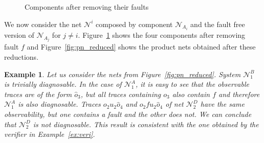 \documentclass[a4paper]{article}
\newcommand\netn{{\mathcal{N}}}
\newtheorem{exmp}{Example}
\begin{document}
\begin{figure}[h]
{{ }}
   \caption{Components after removing their faults}
   \label{fig:reduced}
 \end{figure}

We now consider the net $\netn^i$ composed by component $\netn_{A_i}$ and the fault free version of $\netn_{A_j}$ for $j \not = i$. Figure~\ref{fig:reduced} shows the four components after removing fault $f$ and Figure~\ref{fig:pn_reduced} shows the product nets obtained after these reductions.

\begin{exmp}
  Let us consider the nets from Figure~\ref{fig:pn_reduced}. System $\netn_1^B$ is trivially diagnosable. In the case of $\netn_1^A$, it is easy to see that the observable traces are of the form $\widehat{o}_3$, but all traces containing $o_3$ also contain $f$ and therefore $\netn_1^A$ is also diagnosable. Traces $o_2 u_2 \widehat{o}_4$ and $o_2 f u_2 \widehat{o}_4$ of net $\netn_2^D$ have the same observability, but one contains a fault and the other does not. We can conclude that $\netn_2^D$ is not diagnosable. This result is consistent with the one obtained by the verifier in Example~\ref{ex:veri}.
  \label{ex:two}
\end{exmp}
\end{document}

